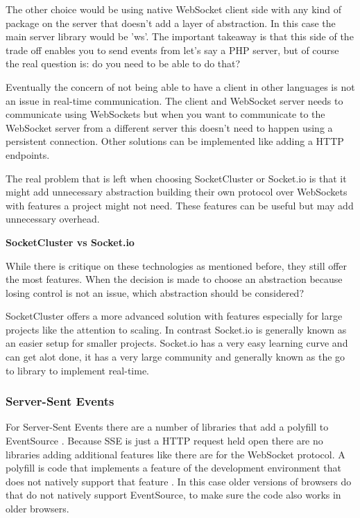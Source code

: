 The other choice would be using native WebSocket client side with any kind of package on the server that doesn't add a layer of abstraction. In this case the main server library would be 'ws'. The important takeaway is that this side of the trade off enables you to send events from let's say a PHP server, but of course the real question is: do you need to be able to do that?

Eventually the concern of not being able to have a client in other languages is not an issue in real-time communication. The client and WebSocket server needs to communicate using WebSockets but when you want to communicate to the WebSocket server from a different server this doesn't need to happen using a persistent connection. Other solutions can be implemented like adding a HTTP endpoints.

The real problem that is left when choosing SocketCluster or Socket.io is that it might add unnecessary abstraction building their own protocol over WebSockets with features a project might not need. These features can be useful but may add unnecessary overhead.

\textbf{SocketCluster vs Socket.io}

While there is critique on these technologies as mentioned before, they still offer the most features. When the decision is made to choose an abstraction because losing control is not an issue, which abstraction should be considered?

SocketCluster offers a more advanced solution with features especially for large projects like the attention to scaling. In contrast Socket.io is generally known as an easier setup for smaller projects. Socket.io has a very easy learning curve and can get alot done, it has a very large community and generally known as the go to library to implement real-time.

\subsubsection{Server-Sent Events}

For Server-Sent Events there are a number of libraries that add a polyfill to EventSource \cite{mdn-sse}. Because SSE is just a HTTP request held open there are no libraries adding additional features like there are for the WebSocket protocol. A polyfill is code that implements a feature of the development environment that does not natively support that feature \cite{polyfill}. In this case older versions of browsers do that do not natively support EventSource, to make sure the code also works in older browsers.

